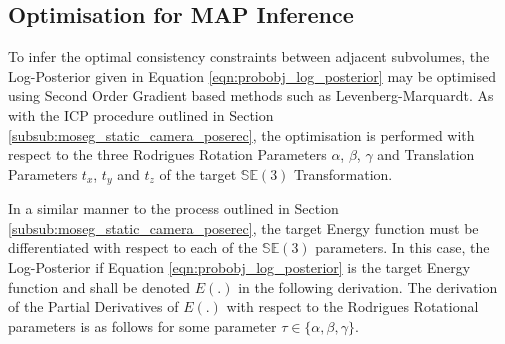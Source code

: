 \subsection{Optimisation for MAP Inference}
\label{subsec:probobj_map_optimisation}
To infer the optimal consistency constraints between adjacent subvolumes, the
Log-Posterior given in Equation \ref{eqn:probobj_log_posterior} may be optimised
using Second Order Gradient based methods such as Levenberg-Marquardt. As with
the ICP procedure outlined in Section \ref{subsub:moseg_static_camera_poserec},
the optimisation is performed with respect to the three Rodrigues Rotation
Parameters $\alpha$, $\beta$, $\gamma$ and Translation Parameters $t_{x}$,
$t_{y}$ and $t_{z}$ of the target $\mathbb{SE}(3)$ Transformation.

In a similar manner to the process outlined in Section
\ref{subsub:moseg_static_camera_poserec}, the target Energy function must be
differentiated with respect to each of the $\mathbb{SE}(3)$ parameters. In this
case, the Log-Posterior if Equation \ref{eqn:probobj_log_posterior} is the
target Energy function and shall be denoted $E(.)$ in the following derivation.
The derivation of the Partial Derivatives of $E(.)$ with respect
to the Rodrigues Rotational parameters is as follows for some parameter
$\tau \in \{\alpha, \beta, \gamma\}$.
